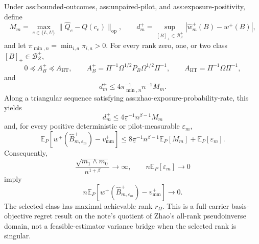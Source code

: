 Under ass:bounded-outcomes, ass:unpaired-pilot, and ass:exposure-positivity, define
\[
 M_m=\max_{e\in\{L,U\}}\lVert\widehat Q_e-Q(c_e)\rVert_{\mathrm{op}},
 \qquad
 d_m^+=\sup_{[B]_+\in\mathcal B_Z^+}
 |\widehat w_m^+(B)-w^+(B)|,
\]
and let \(\pi_{\min,n}=\min_{i,a}\pi_{i,a}>0\).  For every rank zero, one, or two class \([B]_+\in\mathcal B_Z^+\),
\[
 0\preceq A_B^+\preceq A_{\mathrm{HT}},
 \qquad
 A_B^+=\Pi^{-1}\Omega^{1/2}P_B\Omega^{1/2}\Pi^{-1},
 \qquad
 A_{\mathrm{HT}}=\Pi^{-1}\Omega\Pi^{-1},
\]
and
\[
 d_m^+\le 4\pi_{\min,n}^{-1}n^{-1}M_m.
\]
Along a triangular sequence satisfying ass:zhao-exposure-probability-rate, this yields
\[
 d_m^+\le4\underline\pi^{-1}n^{\beta-1}M_m
\tag{A}
\]
and, for every positive deterministic or pilot-measurable \(\varepsilon_m\),
\[
 \mathbb E_P\!\left[
 w^+(\widehat B_{m,\varepsilon_m}^+)-v_{\mathrm{mm}}^+
 \right]
 \le
 8\underline\pi^{-1}n^{\beta-1}\mathbb E_P[M_m]
 +\mathbb E_P[\varepsilon_m].
\tag{B}
\]
Consequently,
\[
 \frac{\sqrt{m_1\wedge m_0}}{n^{1+\beta}}\longrightarrow\infty,
 \qquad n\mathbb E_P[\varepsilon_m]\longrightarrow0
\]
imply
\[
 n\mathbb E_P\!\left[
 w^+(\widehat B_{m,\varepsilon_m}^+)-v_{\mathrm{mm}}^+
 \right]\longrightarrow0.
\]
The selected class has maximal achievable rank \(r_\Omega\).  This is a full-carrier basis-objective regret result on the note's quotient of Zhao's all-rank pseudoinverse domain, not a feasible-estimator variance bridge when the selected rank is singular.